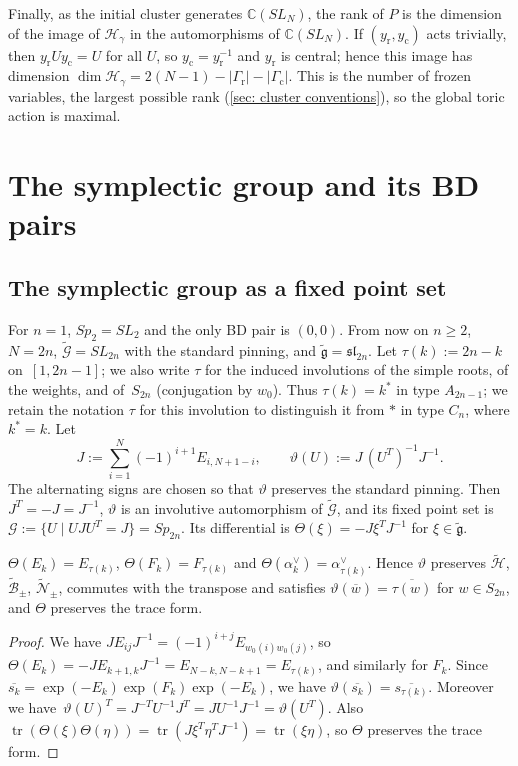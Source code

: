 \documentclass[a4paper]{amsart}
\numberwithin{equation}{section}
\theoremstyle{definition}
\theoremstyle{remark}
\newcommand{\bbC}{\mathbb{C}}
\newcommand{\mfg}{\mathfrak{g}}
\newcommand{\mcG}{\mathcal{G}}
\newcommand{\mcH}{\mathcal{H}}
\newcommand{\mcN}{\mathcal{N}}
\newcommand{\mcB}{\mathcal{B}}
\newcommand{\tG}{\widetilde{\mcG}}
\newcommand{\vt}{\vartheta}
\newcommand{\Vt}{\Theta}
\newcommand{\rr}{\mathrm{r}}
\newcommand{\cc}{\mathrm{c}}
\newcommand{\Sp}{Sp_{2n}}
\newcommand{\SL}{SL_{2n}}
\begin{document}
Finally, as the initial cluster generates $\bbC(SL_N)$, the rank of $P$ is the dimension of the image of $\mcH_\gamma$ in the automorphisms of $\bbC(SL_N)$.
If $(y_{\rr},y_{\cc})$ acts trivially, then $y_{\rr}Uy_{\cc}=U$ for all $U$, so $y_{\cc}=y_{\rr}^{-1}$ and $y_{\rr}$ is central; hence this image has dimension $\dim\mcH_\gamma=2(N-1)-|\Gamma_{\rr}|-|\Gamma_{\cc}|$.
This is the number of frozen variables, the largest possible rank (\cref{sec: cluster conventions}), so the global toric action is maximal.

\section{The symplectic group and its BD pairs}
\label{sec: Sp}
\subsection{The symplectic group as a fixed point set}
\label{sec: fixed points}
For $n=1$, $Sp_2=SL_2$ and the only BD pair is $(0,0)$.
From now on $n\ge2$, $N=2n$, $\tG=\SL$ with the standard pinning, and $\widetilde{\mfg}=\mathfrak{sl}_{2n}$.
Let $\tau(k):=2n-k$ on~$[1,2n-1]$; we also write $\tau$ for the induced involutions of the simple roots, of the weights, and of~$S_{2n}$ (conjugation by $w_0$).
Thus $\tau(k)=k^*$ in type $A_{2n-1}$; we retain the notation $\tau$ for this involution to distinguish it from $*$ in type $C_n$, where $k^*=k$.
Let
\[
  J:=\sum_{i=1}^{N}(-1)^{i+1}E_{i,N+1-i},
  \qquad
  \vt(U):=J\,(U^T)^{-1}J^{-1}.
\]
The alternating signs are chosen so that $\vt$ preserves the standard pinning.
Then $J^T=-J=J^{-1}$, $\vt$ is an involutive automorphism of $\tG$, and its fixed point set is $\mcG:=\{U\mid UJU^T=J\}=\Sp$.
Its differential is $\Vt(\xi)=-J\xi^TJ^{-1}$ for $\xi\in\widetilde{\mfg}$.

\begin{lemma}
  \label{lem: pinning}
  $\Vt(E_k)=E_{\tau(k)}$, $\Vt(F_k)=F_{\tau(k)}$ and $\Vt(\alpha_k^\vee)=\alpha_{\tau(k)}^\vee$.
  Hence $\vt$ preserves $\widetilde{\mcH}$, $\widetilde{\mcB}_\pm$, $\widetilde{\mcN}_\pm$, commutes with the transpose and satisfies $\vt(\overline{w})=\overline{\tau(w)}$ for $w\in S_{2n}$, and $\Vt$ preserves the trace form.
\end{lemma}
\begin{proof}
  We have $JE_{ij}J^{-1}=(-1)^{i+j}E_{w_0(i)w_0(j)}$, so $\Vt(E_k)=-JE_{k+1,k}J^{-1}=E_{N-k,N-k+1}=E_{\tau(k)}$, and similarly for $F_k$.
  Since $\overline{s_k}=\exp(-E_k)\exp(F_k)\exp(-E_k)$, we have $\vt(\overline{s_k})=\overline{s_{\tau(k)}}$.
  Moreover we have~$\vt(U)^T=J^{-T}U^{-1}J^T=JU^{-1}J^{-1}=\vt(U^T)$.
  Also $\operatorname{tr}(\Vt(\xi)\Vt(\eta))=\operatorname{tr}(J\xi^T\eta^TJ^{-1})=\operatorname{tr}(\xi\eta)$, so $\Vt$ preserves the trace form.
\end{proof}
\end{document}
